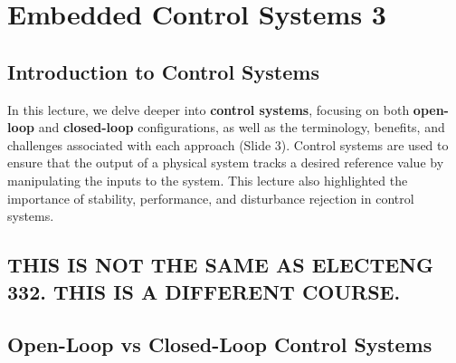 \documentclass[
  14pt,
  a4paper,
  numbers=noendperiod,
  headinclude=true,
  footinclude=true,
  DIV=calc]{scrreprt}
\begin{document}
\chapter{Embedded Control Systems 3}\label{embedded-control-systems-3}

\section{Introduction to Control
Systems}\label{introduction-to-control-systems}

In this lecture, we delve deeper into \textbf{control systems}, focusing
on both \textbf{open-loop} and \textbf{closed-loop} configurations, as
well as the terminology, benefits, and challenges associated with each
approach (Slide 3). Control systems are used to ensure that the output
of a physical system tracks a desired reference value by manipulating
the inputs to the system. This lecture also highlighted the importance
of stability, performance, and disturbance rejection in control systems.

\begin{tcolorbox}[enhanced jigsaw, arc=.35mm, titlerule=0mm, colbacktitle=quarto-callout-important-color!10!white, left=2mm, opacityback=0, title=\textcolor{quarto-callout-important-color}{\faExclamation}\hspace{0.5em}{Important Note}, bottomrule=.15mm, breakable, rightrule=.15mm, toprule=.15mm, bottomtitle=1mm, coltitle=black, opacitybacktitle=0.6, leftrule=.75mm, colframe=quarto-callout-important-color-frame, colback=white, toptitle=1mm]

\section*{\texorpdfstring{\textbf{THIS IS NOT THE SAME AS ELECTENG 332.
THIS IS A DIFFERENT
COURSE.}}{THIS IS NOT THE SAME AS ELECTENG 332. THIS IS A DIFFERENT COURSE.}}\label{this-is-not-the-same-as-electeng-332.-this-is-a-different-course.}


\end{tcolorbox}

\section{Open-Loop vs Closed-Loop Control
Systems}\label{open-loop-vs-closed-loop-control-systems}
\end{document}
